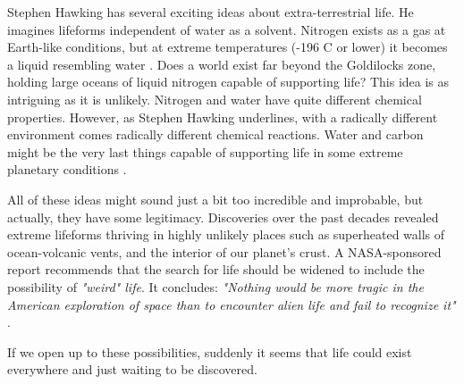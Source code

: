 Stephen Hawking has several exciting ideas about extra-terrestrial life.
He imagines lifeforms independent of water as a solvent.
Nitrogen exists as a gas at Earth-like conditions, but at extreme temperatures (-196 \degree C or lower) it becomes a liquid resembling water \cite{OForm6}.
Does a world exist far beyond the Goldilocks zone, holding large oceans of liquid nitrogen capable of supporting life?
This idea is as intriguing as it is unlikely.
Nitrogen and water have quite different chemical properties.
However, as Stephen Hawking underlines, with a radically different environment comes radically different chemical reactions.
Water and carbon might be the very last things capable of supporting life in some extreme planetary conditions \cite{OForm3}.

All of these ideas might sound just a bit too incredible and improbable, but actually, they have some legitimacy.
Discoveries over the past decades revealed extreme lifeforms thriving in highly unlikely places such as superheated walls of ocean-volcanic vents, and the interior of our planet's crust.
A NASA-sponsored report recommends that the search for life should be widened to include the possibility of \emph{"weird" life}.
It concludes: \emph{"Nothing would be more tragic in the American exploration of space than to encounter alien life and fail to recognize it"} \cite{OForm3}.

If we open up to these possibilities, suddenly it seems that life could exist everywhere and just waiting to be discovered.